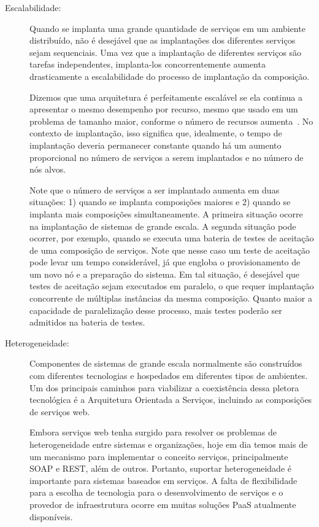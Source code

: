 \begin{description}
\item [Escalabilidade:]

Quando se implanta uma grande quantidade de serviços em um ambiente distribuído,
não é desejável que as implantações dos diferentes serviços sejam sequenciais.
Uma vez que a implantação de diferentes serviços são tarefas independentes,
implanta-los concorrentemente aumenta drasticamente a escalabilidade
do processo de implantação da composição.

Dizemos que uma arquitetura é perfeitamente escalável
se ela continua a apresentar o mesmo desempenho por recurso,
mesmo que usado em um problema de tamanho maior, conforme o número
de recursos aumenta~\cite{Quinn1994Scalability}.
No contexto de implantação, isso significa que, idealmente,
o tempo de implantação deveria permanecer constante quando há um
aumento proporcional no número de serviços a serem implantados e
no número de nós alvos.

Note que o número de serviços a ser implantado aumenta em duas situações:
1) quando se implanta composições maiores e 2) quando se implanta
mais composições simultaneamente. 
A primeira situação ocorre na implantação de sistemas de grande escala.
A segunda situação pode ocorrer, por exemplo,
quando se executa uma bateria de testes de aceitação de uma composição de serviços.
Note que nesse caso um teste de aceitação pode levar um tempo considerável,
já que engloba o provisionamento de um novo nó e a preparação do sistema.
Em tal situação, é desejável que testes de aceitação sejam executados em paralelo,
o que requer implantação concorrente de múltiplas instâncias da mesma composição.
Quanto maior a capacidade de paralelização desse processo,
mais testes poderão ser admitidos na bateria de testes.

\item [Heterogeneidade:]

Componentes de sistemas de grande escala normalmente são construídos com diferentes tecnologias
e hospedados em diferentes tipos de ambientes.
Um dos principais caminhos para viabilizar a coexistência dessa pletora tecnológica
é a Arquitetura Orientada a Serviços, incluindo as composições de serviços web.

Embora serviços web tenha surgido para resolver os problemas de heterogeneidade
entre sistemas e organizações, hoje em dia temos mais de um mecanismo para
implementar o conceito serviços, principalmente SOAP e REST, além de outros.
Portanto, suportar heterogeneidade é importante para sistemas baseados em serviços.
A falta de flexibilidade para a escolha de tecnologia para o desenvolvimento de serviços
e o provedor de infraestrutura ocorre em muitas soluções PaaS atualmente disponíveis.


\end{description}
